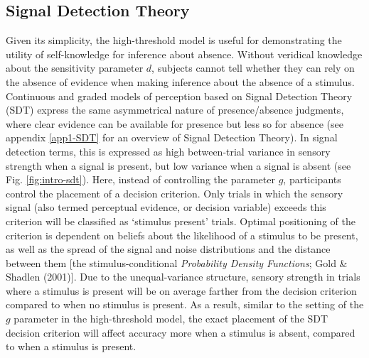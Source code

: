 \documentclass[12pt,twoside]{reedthesis}
\begin{document}
\hypertarget{sdt}{%
\subsection*{Signal Detection Theory}\label{sdt}}

Given its simplicity, the high-threshold model is useful for demonstrating the utility of self-knowledge for inference about absence. Without veridical knowledge about the sensitivity parameter \(d\), subjects cannot tell whether they can rely on the absence of evidence when making inference about the absence of a stimulus. Continuous and graded models of perception based on Signal Detection Theory (SDT) express the same asymmetrical nature of presence/absence judgments, where clear evidence can be available for presence but less so for absence (see appendix \ref{app1-SDT} for an overview of Signal Detection Theory). In signal detection terms, this is expressed as high between-trial variance in sensory strength when a signal is present, but low variance when a signal is absent (see Fig. \ref{fig:intro-sdt}). Here, instead of controlling the parameter \(g\), participants control the placement of a decision criterion. Only trials in which the sensory signal (also termed perceptual evidence, or decision variable) exceeds this criterion will be classified as `stimulus present' trials. Optimal positioning of the criterion is dependent on beliefs about the likelihood of a stimulus to be present, as well as the spread of the signal and noise distributions and the distance between them {[}the stimulus-conditional \emph{Probability Density Functions}; Gold \& Shadlen (2001){]}. Due to the unequal-variance structure, sensory strength in trials where a stimulus is present will be on average farther from the decision criterion compared to when no stimulus is present. As a result, similar to the setting of the \(g\) parameter in the high-threshold model, the exact placement of the SDT decision criterion will affect accuracy more when a stimulus is absent, compared to when a stimulus is present.
\end{document}
